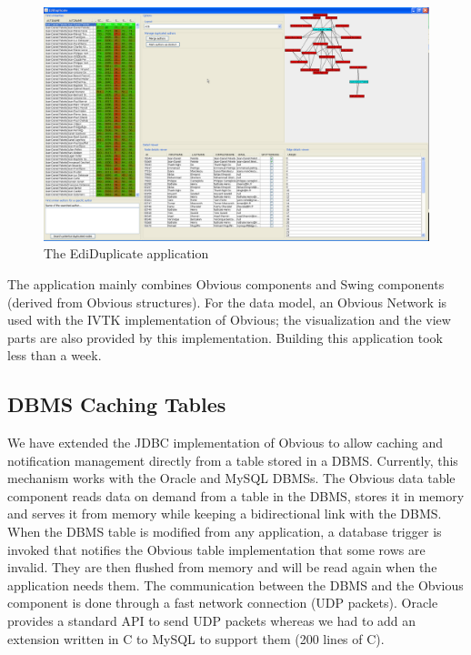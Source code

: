 \begin{figure}[!h]
\includegraphics[width=\columnwidth]{figures/ediduplicate}
\caption{The EdiDuplicate application}
\label{fig:ediduplicate}
\end{figure}

The application mainly combines Obvious components and Swing
components (derived from Obvious structures). For the data model, an
Obvious Network is used with the IVTK implementation of Obvious; the
visualization and the view parts are also provided by this
implementation.  Building this application took less than a week.

\subsection{DBMS Caching Tables}
\label{dbmscachingtable}

We have extended the JDBC implementation of Obvious to allow caching
and notification management directly from a table stored in a DBMS.
Currently, this mechanism works with the Oracle and MySQL DBMSs.  The
Obvious data table component reads data on demand from a table in the
DBMS, stores it in memory and serves it from memory while keeping a
bidirectional link with the DBMS.  When the DBMS table is modified
from any application, a database trigger is invoked that notifies the
Obvious table implementation that some rows are invalid.  They are
then flushed from memory and will be read again when the application
needs them.  The communication between the DBMS and the Obvious
component is done through a fast network connection (UDP packets).
Oracle provides a standard API to send UDP packets whereas we had to
add an extension written in C to MySQL to support them (200 lines of
C).

